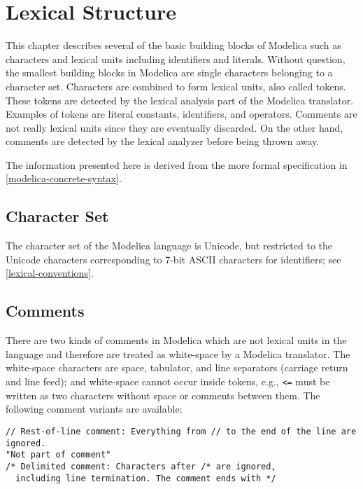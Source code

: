 \chapter{Lexical Structure}\label{lexical-structure}

This chapter describes several of the basic building blocks of Modelica
such as characters and lexical units including identifiers and literals.
Without question, the smallest building blocks in Modelica are single
characters belonging to a character set. Characters are combined to form
lexical units, also called tokens. These tokens are detected by the
lexical analysis part of the Modelica translator. Examples of tokens are
literal constants, identifiers, and operators. Comments are not really
lexical units since they are eventually discarded. On the other hand,
comments are detected by the lexical analyzer before being thrown away.

The information presented here is derived from the more formal
specification in \cref{modelica-concrete-syntax}.

\section{Character Set}\label{character-set}

The character set of the Modelica language is Unicode, but restricted to the Unicode characters corresponding to 7-bit ASCII characters for identifiers; see \cref{lexical-conventions}.

\section{Comments}\label{comments}

There are two kinds of comments in Modelica which are not lexical units in the language and therefore are treated as white-space by a Modelica translator.
The white-space characters are space, tabulator, and line separators (carriage return and line feed); and white-space cannot occur inside tokens, e.g., \lstinline!<=! must be written as two characters without space or comments between them.
The following comment variants are available:
\begin{lstlisting}[language=modelica]
// Rest-of-line comment: Everything from // to the end of the line are ignored.
"Not part of comment"
/* Delimited comment: Characters after /* are ignored,
  including line termination. The comment ends with */
\end{lstlisting}

